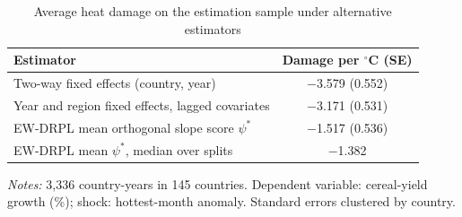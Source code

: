 \begin{table}[htbp]
\centering
\caption{Average heat damage on the estimation sample under alternative estimators}\label{tab:recon}
\small
\begin{tabular}{lc}
\toprule
Estimator & Damage per $^{\circ}$C (SE) \\
\midrule
Two-way fixed effects (country, year) & $-$3.579 (0.552) \\
Year and region fixed effects, lagged covariates & $-$3.171 (0.531) \\
EW-DRPL mean orthogonal slope score $\psi^*$ & $-$1.517 (0.536) \\
EW-DRPL mean $\psi^*$, median over splits & $-$1.382 \\
\bottomrule
\end{tabular}
\begin{minipage}{0.9\textwidth}\footnotesize\smallskip
\emph{Notes:} 3,336 country-years in 145 countries. Dependent variable: cereal-yield growth (\%);
shock: hottest-month anomaly. Standard errors clustered by country.
\end{minipage}
\end{table}
